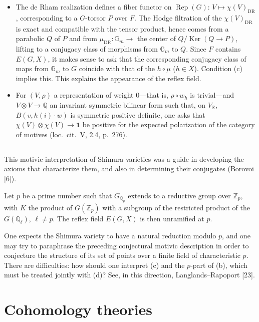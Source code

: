 \documentclass[11pt,a4paper]{article}
\theoremstyle{plain}
\theoremstyle{definition}
\DeclareMathOperator{\Ker}{Ker}
\DeclareMathOperator{\Rep}{Rep}
\newcommand{\Q}{\mathbb{Q}}
\newcommand{\Z}{\mathbb{Z}}
\newcommand{\R}{\mathbb{R}}
\DeclareMathOperator{\DR}{DR}
\begin{document}
\begin{itemize}
\item[(d)] The de Rham realization defines a fiber functor on $\Rep(G)$: $V\mapsto\chi(V)_{\DR}$, corresponding to a $G$-torsor $P$ over $F$. The Hodge filtration of the $\chi(V)_{\DR}$ is exact and compatible with the tensor product, hence comes from a parabolic $Q$ of $P$ and from $\mu_{\DR}:\mathbb{G}_m\to$ the center of $Q/\Ker(Q\to P)$, lifting to a conjugacy class of morphisms from $\mathbb{G}_m$ to $Q$. Since $F$ contains $E(G,X)$, it makes sense to ask that the corresponding conjugacy class of maps from $\mathbb{G}_m$ to $G$ coincide with that of the $h\circ\mu$ ($h\in X$). Condition (c) implies this. This explains the appearance of the reflex field.

\item[(e)] For $(V,\rho)$ a representation of weight $0$---that is, $\rho\circ w_h$ is trivial---and $V\otimes V\to\Q$ an invariant symmetric bilinear form such that, on $V_{\R}$, $B(v,h(i)\cdot w)$ is symmetric positive definite, one asks that $\chi(V)\otimes\chi(V)\to\mathbf{1}$ be positive for the expected polarization of the category of motives (loc.~cit.~V, 2.4, p.~276).
\end{itemize}

\subsection{}

This motivic interpretation of Shimura varieties was a guide in developing the axioms that characterize them, and also in determining their conjugates (Borovoi [6]).

Let $p$ be a prime number such that $G_{\Q_p}$ extends to a reductive group over $\Z_p$, with $K$ the product of $G(\Z_p)$ with a subgroup of the restricted product of the $G(\Q_\ell)$, $\ell\neq p$. The reflex field $E(G,X)$ is then unramified at $p$.

One expects the Shimura variety to have a natural reduction modulo $p$, and one may try to paraphrase the preceding conjectural motivic description in order to conjecture the structure of its set of points over a finite field of characteristic $p$. There are difficulties: how should one interpret (c) and the $p$-part of (b), which must be treated jointly with (d)? See, in this direction, Langlands--Rapoport [23].

\section{Cohomology theories}
\end{document}
